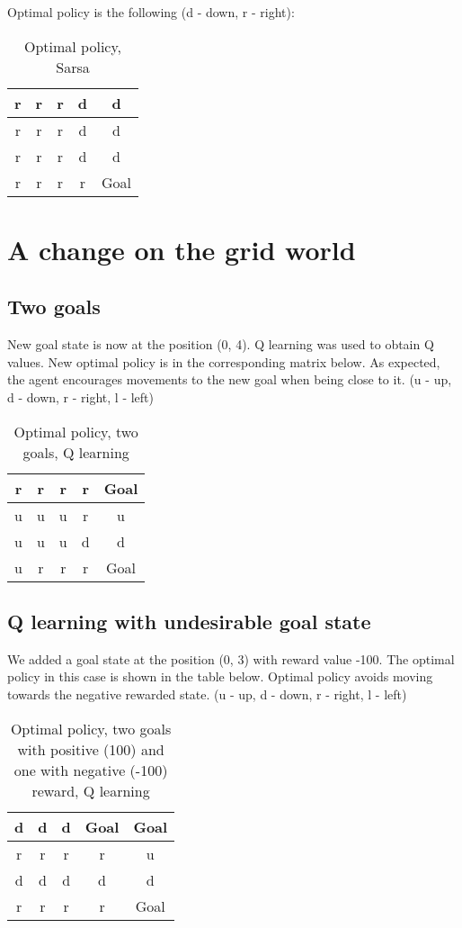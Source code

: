 \documentclass{article}
\begin{document}
Optimal policy is the following (d - down, r - right):

\begin{table*}
\centering
\begin{tabular}{|c|c|c|c|c|}
\hline
r & r & r & d & d \\
\hline
r & r & r & d & d \\
\hline
r & r & r & d & d \\
\hline
r & r & r & r & Goal \\
\hline
\end{tabular}
\caption{Optimal policy, Sarsa}	
\end{table*}

\section{A change on the grid world}

\subsection{Two goals}

New goal state is now at the position (0, 4). Q learning was used to obtain Q values. New optimal policy is in the corresponding matrix below. As expected, the agent encourages movements to the new goal when being close to it. (u - up, d - down, r - right, l - left)

\begin{table}
\centering
\label{mat:two_goals}
\begin{tabular}{|c|c|c|c|c|}
\hline
r & r & r & r & Goal \\
\hline
u & u & u & r & u \\
\hline
u & u & u & d & d \\
\hline
u & r & r & r & Goal \\
\hline
\end{tabular}
\caption{Optimal policy, two goals, Q learning}	
\end{table}

\subsection{Q learning with undesirable goal state}

We added a goal state at the position (0, 3) with reward value -100. The optimal policy in this case is shown in the table below. Optimal policy avoids moving towards the negative rewarded state. (u - up, d - down, r - right, l - left)


\begin{table}
\centering
\label{mat:two_goals}
\begin{tabular}{|c|c|c|c|c|}
\hline
d & d & d & Goal & Goal \\
\hline
r & r & r & r & u \\
\hline
d & d & d & d & d \\
\hline
r & r & r & r & Goal \\
\hline
\end{tabular}
\caption{Optimal policy, two goals with positive (100) and one with negative (-100) reward, Q learning}	
\end{table}
\end{document}
